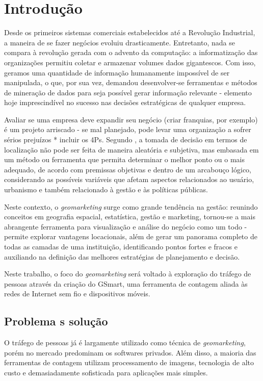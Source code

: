 ﻿
\chapter{Introdução}
\label{introducao}

Desde os primeiros sistemas comerciais estabelecidos até a Revolução Industrial,
a maneira de se fazer negócios evoluiu drasticamente. Entretanto, nada se
compara à revolução gerada com o advento da computação: a informatização das
organizações permitiu coletar e armazenar volumes dados
gigantescos. Com isso, geramos uma quantidade de informação humanamente impossível de
ser manipulada, o que, por sua vez, demandou desenvolver-se ferramentas e
métodos de mineração de dados para seja possível gerar informação relevante - elemento hoje imprescindível no sucesso nas decisões estratégicas de qualquer empresa. 

Avaliar se uma empresa deve expandir seu negócio (criar franquias, por exemplo) é um projeto
arriscado - se mal planejado, pode levar uma organização a sofrer sérios
prejuízos * incluir os 4Ps. Segundo , a tomada de decisão em termos de
localização não pode ser feita de maneira aleatória e subjetiva, mas embasada em
um método ou ferramenta que permita determinar o melhor ponto ou o mais
adequado, de acordo com premissas objetivas e dentro de um arcabouço lógico,
considerando as possíveis variáveis que afetam aspectos relacionados ao usuário,
urbanismo e também relacionado à gestão e às políticas públicas. 

Neste contexto, o \emph{geomarketing} surge como grande tendência na gestão: reunindo conceitos em geografia espacial, estatística, gestão e marketing, tornou-se a mais abrangente ferramenta para visualização e análise do negócio como um todo - permite explorar vantagens locacionais, além de gerar um panorama completo de todas as camadas de uma instituição, identificando pontos fortes e fracos e auxiliando na definição das melhores estratégias de planejamento e decisão.

Neste trabalho, o foco do \emph{geomarketing} será voltado à exploração do tráfego
de pessoas através da criação do GSmart, uma ferramenta de contagem aliada às redes de
Internet sem fio e dispositivos móveis.

\section{Problema s solução}
O tráfego de pessoas já é largamente utilizado como técnica de \emph{geomarketing}, porém
no mercado predominam os softwares privados. Além disso, a maioria das ferramentas de contagem  utilizam processamento de imagens, tecnologia de alto custo e demasiadamente sofisticada para aplicações mais simples. 

